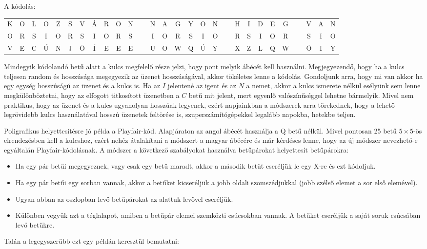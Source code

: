 A kódolás: 

{\setlength{\tabcolsep}{1.5pt}\bfseries
	\renewcommand*{\arraystretch}{1.4}
	\begin{center}
		\begin{tabular}{cccccccccccccccccccccccccccc}
			K & O & L & O & Z & S & V & Á & R & O & N & \ & N & A & G & Y & O & N & \ & H & I & D & E & G & \  &  V & A & N\tabularnewline
			O & R & S & I & O & R & S & I & O & R & S & \ & I & O & R & S & I & O & \ & R & S & I & O & R & \  &  S & I & O\tabularnewline
			\hline
			V & E & C & Ú & N & J & Ö & Í & E & E & E & \  & U & O & W & Q & Ú & Y & \  & X & Z & L & Q & W & \  &  Ö & I & Y
		\end{tabular}
	\end{center}
}
Mindegyik kódolandó betű alatt a kulcs megfelelő része jelzi, hogy
pont melyik ábécét kell használni. Megjegyezendő, hogy ha a kulcs
teljesen random és hosszúsága megegyezik az üzenet hosszúságával,
akkor tökéletes lenne a kódolás. Gondoljunk arra, hogy mi van akkor
ha egy egység hosszúságú az üzenet és a kulcs is. Ha az $I$ jelentené
az igent és az $N$ a nemet, akkor a kulcs ismerete nélkül esélyünk
sem lenne megkülönböztetni, hogy az elfogott titkosított üzenetben
a $C$ betű mit jelent, mert egyenlő valószínűséggel lehetne bármelyik.
Mivel nem praktikus, hogy az üzenet és a kulcs ugyanolyan hosszúak
legyenek, ezért napjainkban a módszerek arra törekednek, hogy a lehető
legrövidebb kulcs használatával hosszú üzenetek feltörése is, szuperszámítógépekkel
legalább napokba, hetekbe teljen.

Poligrafikus helyettesítésre jó példa a Playfair-kód. Alapjáraton
az angol ábécét használja a Q betű nélkül. Mivel pontosan 25 betű
$5\times5$-ös elrendezésben kell a kulcshoz, ezért nehéz átalakítani
a módszert a magyar ábécére és már kérdéses lenne, hogy az új módszer
nevezhető-e egyáltalán Playfair-kódolásnak. A módszer a következő
szabályokat használva betűpárokat helyettesít betűpárokra: 
\begin{itemize}
\item Ha egy pár betűi megegyeznek, vagy csak egy betű maradt, akkor a második
betűt cseréljük le egy X-re és ezt kódoljuk. 
\item Ha egy pár betűi egy sorban vannak, akkor a betűket kicseréljük a
jobb oldali szomszédjukkal (jobb szélső elemet a sor első elemével). 
\item Ugyan abban az oszlopban levő betűpárokat az alattuk levővel cseréljük. 
\item Különben vegyük azt a téglalapot, amiben a betűpár elemei szemközti
csúcsokban vannak. A betűket cseréljük a saját soruk csúcsában levő
betűkre. 
\end{itemize}
Talán a legegyszerűbb ezt egy példán keresztül bemutatni:\\
 
